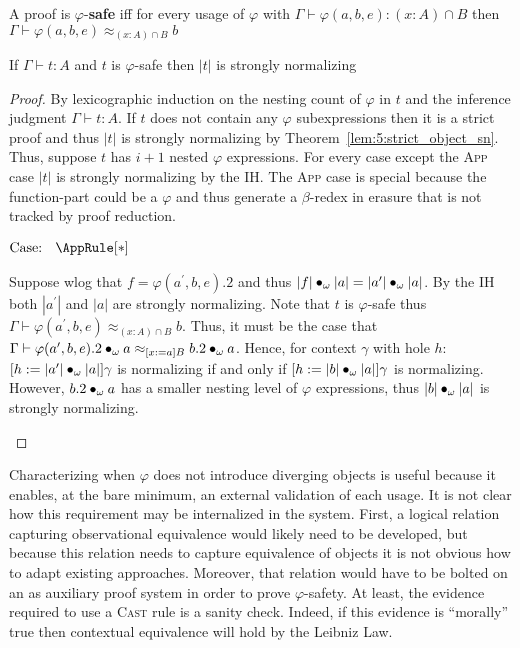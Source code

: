 \begin{definition}
    A proof is $\varphi$-\textbf{safe} iff for every usage of $\varphi$ with $\Gamma \vdash \varphi(a, b, e) : (x : A) \cap B$ then $\Gamma \vdash \varphi(a, b, e) \approx_{(x : A) \cap B} b$
\end{definition}

\begin{theorem}
    If $\Gamma \vdash t : A$ and $t$ is $\varphi$-safe then $|t|$ is strongly normalizing
\end{theorem}
\begin{proof}
    By lexicographic induction on the nesting count of $\varphi$ in $t$ and the inference judgment $\Gamma \vdash t : A$.
    If $t$ does not contain any $\varphi$ subexpressions then it is a strict proof and thus $|t|$ is strongly normalizing by Theorem~\ref{lem:5:strict_object_sn}.
    Thus, suppose $t$ has $i + 1$ nested $\varphi$ expressions.
    For every case except the \textsc{App} case $|t|$ is strongly normalizing by the IH.
    The \textsc{App} case is special because the function-part could be a $\varphi$ and thus generate a $\beta$-redex in erasure that is not tracked by proof reduction.

    $\text{Case: }\begin{array}{c} \AppRule[*] \end{array}$
    \begin{proofcase}
        Suppose wlog that $f = \varphi(a^\prime, b, e).2$ and thus $|f| \bullet_{\omega} |a| = |a^\prime| \bullet_{\omega} |a|$.
        By the IH both $|a^\prime|$ and $|a|$ are strongly normalizing.
        Note that $t$ is $\varphi$-safe thus $\Gamma \vdash \varphi(a^\prime, b, e) \approx_{(x : A) \cap B} b$.
        Thus, it must be the case that $\Gamma \vdash \varphi(a^\prime, b, e).2 \bullet_{\omega} a \approx_{[x := a]B} b.2 \bullet_{\omega} a$.
        Hence, for context $\gamma$ with hole $h$: $[h := |a^\prime| \bullet_{\omega} |a|]\gamma$ is normalizing if and only if $[h := |b| \bullet_{\omega} |a|]\gamma$ is normalizing.
        However, $b.2 \bullet_{\omega} a$ has a smaller nesting level of $\varphi$ expressions, thus $|b| \bullet_{\omega} |a|$ is strongly normalizing.
    \end{proofcase}
\end{proof}

Characterizing when $\varphi$ does not introduce diverging objects is useful because it enables, at the bare minimum, an external validation of each usage.
It is not clear how this requirement may be internalized in the system.
First, a logical relation capturing observational equivalence would likely need to be developed, but because this relation needs to capture equivalence of objects it is not obvious how to adapt existing approaches.
Moreover, that relation would have to be bolted on an as auxiliary proof system in order to prove $\varphi$-safety.
At least, the evidence required to use a \textsc{Cast} rule is a sanity check.
Indeed, if this evidence is ``morally'' true then contextual equivalence will hold by the Leibniz Law.

